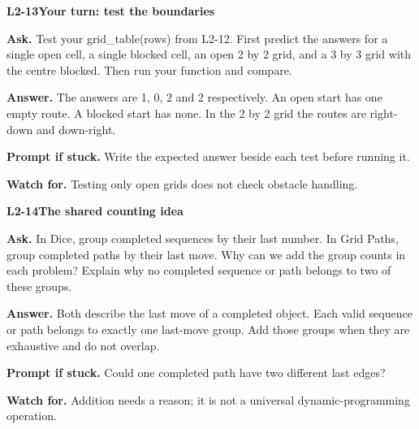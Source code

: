 \documentclass[11pt,a4paper]{article}
\begin{document}
\noindent\begin{minipage}{\textwidth}
{\color{teal}\textbf{L2-13}}\quad \textbf{Your turn: test the boundaries}\par\smallskip
\textbf{Ask.} Test your grid\_table(rows) from L2-12. First predict the answers for a single open cell, a single blocked cell, an open 2 by 2 grid, and a 3 by 3 grid with the centre blocked. Then run your function and compare.\par\smallskip
\textbf{Answer.} The answers are 1, 0, 2 and 2 respectively. An open start has one empty route. A blocked start has none. In the 2 by 2 grid the routes are right-down and down-right.\par\smallskip
\textbf{Prompt if stuck.} Write the expected answer beside each test before running it.\par\smallskip
\textbf{Watch for.} Testing only open grids does not check obstacle handling.
\end{minipage}\par{}\medskip

\noindent\begin{minipage}{\textwidth}
{\color{teal}\textbf{L2-14}}\quad \textbf{The shared counting idea}\par\smallskip
\textbf{Ask.} In Dice, group completed sequences by their last number. In Grid Paths, group completed paths by their last move. Why can we add the group counts in each problem? Explain why no completed sequence or path belongs to two of these groups.\par\smallskip
\textbf{Answer.} Both describe the last move of a completed object. Each valid sequence or path belongs to exactly one last-move group. Add those groups when they are exhaustive and do not overlap.\par\smallskip
\textbf{Prompt if stuck.} Could one completed path have two different last edges?\par\smallskip
\textbf{Watch for.} Addition needs a reason; it is not a universal dynamic-programming operation.
\end{minipage}\par{}\medskip
\end{document}
